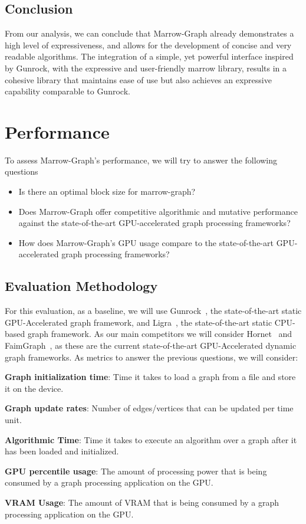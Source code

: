 \subsection{Conclusion}

From our analysis, we can conclude that Marrow-Graph already demonstrates a high level of expressiveness, and allows for the development of concise and very readable algorithms. 
The integration of a simple, yet powerful interface inspired by Gunrock, with the expressive and user-friendly marrow library, results in a cohesive library that maintains ease of use but also achieves an expressive capability comparable to Gunrock.



\section{Performance}

To assess Marrow-Graph's performance, we will try to answer the following questions
\begin{itemize}
    \item Is there an optimal block size for marrow-graph?
    \item Does Marrow-Graph offer competitive algorithmic and mutative performance against the state-of-the-art \gls{GPU}-accelerated graph processing frameworks?
    \item How does Marrow-Graph's \gls{GPU} usage compare to the state-of-the-art \gls{GPU}-accelerated graph processing frameworks?
\end{itemize}

\subsection{Evaluation Methodology}

For this evaluation, as a baseline, we will use Gunrock~\cite{paper:gunrock}, the state-of-the-art static GPU-Accelerated graph framework, and Ligra~\cite{paper:ligra}, the state-of-the-art static CPU-based graph framework. As our main competitors we will consider Hornet~\cite{paper:hornet} and FaimGraph~\cite{paper:faimgraph}, as these are the current state-of-the-art GPU-Accelerated dynamic graph frameworks.
%
As metrics to answer the previous questions, we will consider: 
\begin{description}
    \item \textbf{Graph initialization time}: Time it takes to load a graph from a file and store it on the device.
    \item \textbf{Graph update rates}: Number of edges/vertices that can be updated per time unit.
    \item \textbf{Algorithmic Time}: Time it takes to execute an algorithm over a graph after it has been loaded and initialized.
    \item \textbf{\gls{GPU} percentile usage}: The amount of processing power that is being consumed by a graph processing application on the \gls{GPU}.
    \item \textbf{\gls{VRAM} Usage}: The amount of \gls{VRAM} that is being consumed by a graph processing application on the \gls{GPU}.
\end{description}

